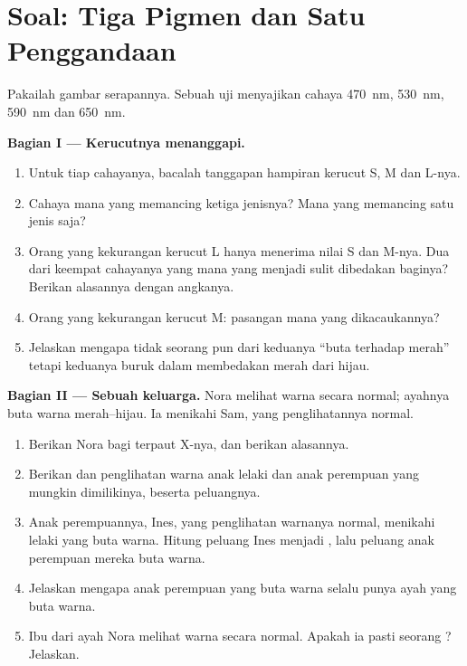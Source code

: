 \section{Soal: Tiga Pigmen dan Satu Penggandaan}

\begin{problem}
\label{pb:g11:the-eye:1}
Pakailah gambar serapannya. Sebuah uji menyajikan cahaya \qty{470}{nm},
\qty{530}{nm}, \qty{590}{nm} dan \qty{650}{nm}.

\medskip
\noindent\textbf{Bagian I --- Kerucutnya menanggapi.}
\begin{enumerate}
  \item Untuk tiap cahayanya, bacalah tanggapan hampiran kerucut S, M
        dan L-nya.
  \item Cahaya mana yang memancing ketiga jenisnya? Mana yang memancing
        satu jenis saja?
  \item Orang yang kekurangan kerucut L hanya menerima nilai S dan
        M-nya. Dua dari keempat cahayanya yang mana yang menjadi sulit
        dibedakan baginya? Berikan alasannya dengan angkanya.
  \item Orang yang kekurangan kerucut M: pasangan mana yang
        dikacaukannya?
  \item Jelaskan mengapa tidak seorang pun dari keduanya ``buta
        terhadap merah'' tetapi keduanya buruk dalam membedakan merah
        dari hijau.
\end{enumerate}

\medskip
\noindent\textbf{Bagian II --- Sebuah keluarga.}
Nora melihat warna secara normal; ayahnya buta warna merah--hijau. Ia
menikahi Sam, yang penglihatannya normal.
\begin{enumerate}[resume]
  \item Berikan  Nora bagi   terpaut X-nya, dan berikan
        alasannya.
  \item Berikan  dan penglihatan warna anak lelaki dan anak
        perempuan yang mungkin dimilikinya, beserta peluangnya.
  \item Anak perempuannya, Ines, yang penglihatan warnanya normal,
        menikahi lelaki yang buta warna. Hitung peluang Ines menjadi
        , lalu peluang anak perempuan mereka buta warna.
  \item Jelaskan mengapa anak perempuan yang buta warna selalu punya
        ayah yang buta warna.
  \item Ibu dari ayah Nora melihat warna secara normal. Apakah ia pasti
        seorang ? Jelaskan.
\end{enumerate}


\end{problem}
